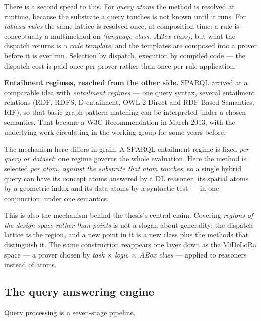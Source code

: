 \documentclass[11pt,a4paper,DIV=12,parskip=half]{scrartcl}
\newenvironment{note}
  {\begin{list}{}{\setlength{\leftmargin}{1.5em}\setlength{\rightmargin}{1.5em}%
                  \setlength{\listparindent}{0pt}}\item[]\small}
  {\end{list}}
\begin{document}
There is a second speed to this. For \emph{query atoms} the method is resolved at
runtime, because the substrate a query touches is not known until it runs. For
\emph{tableau rules} the same lattice is resolved once, at composition time: a
rule is conceptually a multimethod on \emph{(language class, ABox class)}, but
what the dispatch returns is a \emph{code template}, and the templates are
composed into a prover before it is ever run. Selection by dispatch, execution by
compiled code --- the dispatch cost is paid once per prover rather than once per
rule application.

\begin{note}
\textbf{Entailment regimes, reached from the other side.} SPARQL arrived at a
comparable idea with \emph{entailment regimes} --- one query syntax, several
entailment relations (RDF, RDFS, D-entailment, OWL 2 Direct and RDF-Based
Semantics, RIF), so that basic graph pattern matching can be interpreted under a
chosen semantics. That became a W3C Recommendation in March 2013, with the
underlying work circulating in the working group for some years before.

The mechanism here differs in grain. A SPARQL entailment regime is fixed
\emph{per query or dataset}: one regime governs the whole evaluation. Here the
method is selected \emph{per atom, against the substrate that atom touches}, so a
single hybrid query can have its concept atoms answered by a DL reasoner, its
spatial atoms by a geometric index and its data atoms by a syntactic test --- in
one conjunction, under one semantics.

This is also the mechanism behind the thesis's central claim. Covering
\emph{regions of the design space rather than points} is not a slogan about
generality: the dispatch lattice \emph{is} the region, and a new point in it is a
new class plus the methods that distinguish it. The same construction reappears
one layer down as the MiDeLoRa space --- a prover chosen by \emph{task $\times$
logic $\times$ ABox class} --- applied to reasoners instead of atoms.
\end{note}

\subsection{The query answering engine}

Query processing is a seven-stage pipeline.

\begin{center}
\end{center}
\end{document}
